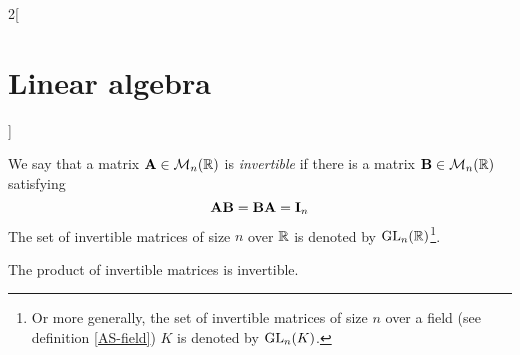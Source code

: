 \documentclass[../../../main.tex]{subfiles}
\begin{document}
\begin{multicols}{2}[\section{Linear algebra}]
\begin{prop}
\begin{enumerate}
        \end{enumerate}
    \end{prop}
    \begin{definition}
        We say that a matrix $\boldsymbol{\mathrm{A}}\in\mathcal{M}_n(\mathbb{R})$ is \textit{invertible} if there is a matrix $\boldsymbol{\mathrm{B}}\in\mathcal{M}_n(\mathbb{R})$ satisfying $$\boldsymbol{\mathrm{A}}\boldsymbol{\mathrm{B}}=\boldsymbol{\mathrm{B}}\boldsymbol{\mathrm{A}}=\boldsymbol{\mathrm{I}}_n$$
        The set of invertible matrices of size $n$ over $\mathbb{R}$ is denoted by $\mathrm{GL}_n(\mathbb{R})$\footnote{Or more generally, the set of invertible matrices of size $n$ over a field (see definition \ref{AS-field}) $K$ is denoted by $\mathrm{GL}_n(K)$.}.
    \end{definition}
    \begin{lemma}
        The product of invertible matrices is invertible.
    \end{lemma}

\end{multicols}
\end{document}

